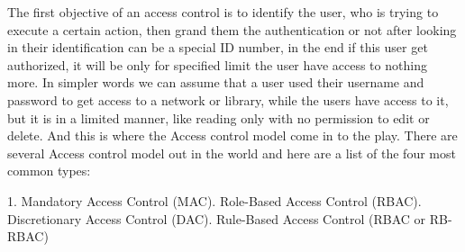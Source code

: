 \documentclass[conference]{IEEEtran}
\begin{document}
The first objective of an access control is to identify the user, who is trying to execute a certain action, then grand them the authentication or not after looking in their identification can be a special ID number, in the end if this user get authorized, it will be only for specified limit the user have access to nothing more. In simpler words we can assume that a user used their username and password to get access to a network or library, while the users have access to it, but it is in a limited manner, like reading only with no permission to edit or delete. And this is where the Access control model come in to the play.
\newline
\newline There are several Access control model out in the world and here are a list of the four most common types: \newline
\begin{enumerate}
1.	Mandatory Access Control (MAC).	Role-Based Access Control (RBAC).	Discretionary Access Control (DAC).	Rule-Based Access Control (RBAC or RB-RBAC)\newline
\end{enumerate}
\newline
\end{document}
